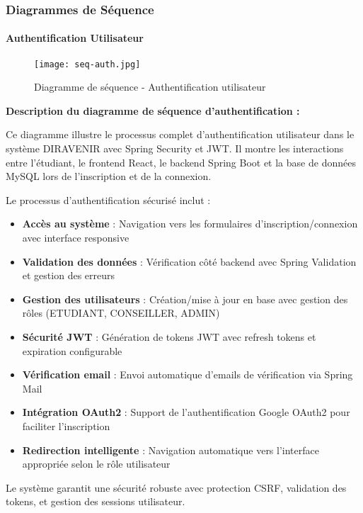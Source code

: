 \documentclass[12pt,a4paper]{report}
\begin{document}
\subsubsection{Diagrammes de Séquence}

\paragraph{Authentification Utilisateur}

\begin{figure}[H]
\centering
\texttt{[image: seq-auth.jpg]}
\caption{Diagramme de séquence - Authentification utilisateur}
\label{fig:diagramme_sequence_authentification}
\end{figure}

\textbf{Description du diagramme de séquence d'authentification :}

Ce diagramme illustre le processus complet d'authentification utilisateur dans le système DIRAVENIR avec Spring Security et JWT. Il montre les interactions entre l'étudiant, le frontend React, le backend Spring Boot et la base de données MySQL lors de l'inscription et de la connexion.

Le processus d'authentification sécurisé inclut :
\begin{itemize}
    \item \textbf{Accès au système} : Navigation vers les formulaires d'inscription/connexion avec interface responsive
    \item \textbf{Validation des données} : Vérification côté backend avec Spring Validation et gestion des erreurs
    \item \textbf{Gestion des utilisateurs} : Création/mise à jour en base avec gestion des rôles (ETUDIANT, CONSEILLER, ADMIN)
    \item \textbf{Sécurité JWT} : Génération de tokens JWT avec refresh tokens et expiration configurable
    \item \textbf{Vérification email} : Envoi automatique d'emails de vérification via Spring Mail
    \item \textbf{Intégration OAuth2} : Support de l'authentification Google OAuth2 pour faciliter l'inscription
    \item \textbf{Redirection intelligente} : Navigation automatique vers l'interface appropriée selon le rôle utilisateur
\end{itemize}

Le système garantit une sécurité robuste avec protection CSRF, validation des tokens, et gestion des sessions utilisateur.
\end{document}
